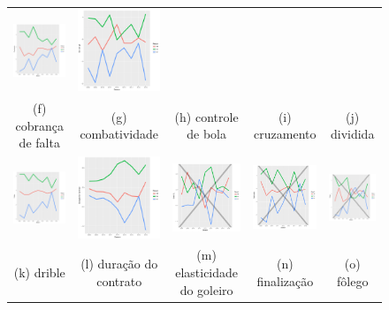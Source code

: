 \documentclass[review]{elsarticle}
\begin{document}
\begin{figure}
\begin{tabular}{ccccc}
  \includegraphics[width=25mm]{cruzamento_result} & \includegraphics[width=25mm]{div_empe_result} \\
 \scriptsize{(f) cobrança de falta } & \scriptsize{(g) combatividade } & \scriptsize{(h) controle de bola} & \scriptsize{(i) cruzamento} & \scriptsize{(j) dividida}\\[3pt]
 
 \includegraphics[width=25mm]{dribles_result} & \includegraphics[width=25mm]{duracaodocontrato_result} &   \includegraphics[width=25mm]{elast_gl_result} &
  \includegraphics[width=25mm]{finalizacao_result} & \includegraphics[width=25mm]{folego_result}  \\
 \scriptsize{(k) drible} & \scriptsize{(l) duração do contrato } & \scriptsize{(m) elasticidade do goleiro} & \scriptsize{(n) finalização} & \scriptsize{(o) fôlego}\\[3pt]
 

\end{tabular}
\end{figure}
\end{document}
